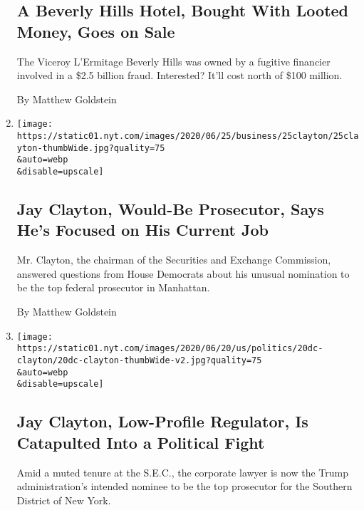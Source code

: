 \begin{enumerate}
  \hypertarget{a-beverly-hills-hotel-bought-with-looted-money-goes-on-sale}{%
  \subsection{A Beverly Hills Hotel, Bought With Looted Money, Goes on
  Sale}\label{a-beverly-hills-hotel-bought-with-looted-money-goes-on-sale}}

  The Viceroy L'Ermitage Beverly Hills was owned by a fugitive financier
  involved in a \$2.5 billion fraud. Interested? It'll cost north of
  \$100 million.

  By Matthew Goldstein
\item
  \href{/2020/06/25/business/jay-clayton-sec-sdny.html}{}

  \texttt{[image: https://static01.nyt.com/images/2020/06/25/business/25clayton/25clayton-thumbWide.jpg?quality=75\\\&auto=webp\\\&disable=upscale]}

  \hypertarget{jay-clayton-would-be-prosecutor-says-hes-focused-on-his-current-job}{%
  \subsection{Jay Clayton, Would-Be Prosecutor, Says He's Focused on His
  Current
  Job}\label{jay-clayton-would-be-prosecutor-says-hes-focused-on-his-current-job}}

  Mr. Clayton, the chairman of the Securities and Exchange Commission,
  answered questions from House Democrats about his unusual nomination
  to be the top federal prosecutor in Manhattan.

  By Matthew Goldstein
\item
  \href{/2020/06/20/business/jay-clayton-sdny-sec.html}{}

  \texttt{[image: https://static01.nyt.com/images/2020/06/20/us/politics/20dc-clayton/20dc-clayton-thumbWide-v2.jpg?quality=75\\\&auto=webp\\\&disable=upscale]}

  \hypertarget{jay-clayton-low-profile-regulator-is-catapulted-into-a-political-fight}{%
  \subsection{Jay Clayton, Low-Profile Regulator, Is Catapulted Into a
  Political
  Fight}\label{jay-clayton-low-profile-regulator-is-catapulted-into-a-political-fight}}

  Amid a muted tenure at the S.E.C., the corporate lawyer is now the
  Trump administration's intended nominee to be the top prosecutor for
  the Southern District of New York.


\end{enumerate}
